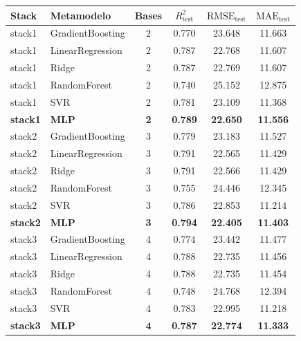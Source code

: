 \begin{table}
    \centering
    \small
    \footnotesize
        \begin{tabular}{llcccc}
        \hline
        \textbf{Stack}  & \textbf{Metamodelo}    & \textbf{Bases} & $R^2_{\text{test}}$ & $\text{RMSE}_{\text{test}}$  & $\text{MAE}_{\text{test}}$   \\
        \hline
        stack1 & GradientBoosting & 2 & 0.770 & 23.648 & 11.663 \\
        stack1 & LinearRegression & 2 & 0.787 & 22.768 & 11.607 \\
        stack1 & Ridge            & 2 & 0.787 & 22.769 & 11.607 \\
        stack1 & RandomForest     & 2 & 0.740 & 25.152 & 12.875 \\
        stack1 & SVR              & 2 & 0.781 & 23.109 & 11.368 \\
        \textbf{stack1} & \textbf{MLP}   & \textbf{2} & \textbf{0.789} & \textbf{22.650} & \textbf{11.556} \\
        \hline
        stack2 & GradientBoosting & 3 & 0.779 & 23.183 & 11.527 \\
        stack2 & LinearRegression & 3 & 0.791 & 22.565 & 11.429 \\
        stack2 & Ridge            & 3 & 0.791 & 22.566 & 11.429 \\
        stack2 & RandomForest     & 3 & 0.755 & 24.446 & 12.345 \\
        stack2 & SVR              & 3 & 0.786 & 22.853 & 11.214 \\
        \textbf{stack2} & \textbf{MLP} & \textbf{3} & \textbf{0.794} & \textbf{22.405} & \textbf{11.403} \\
        \hline
        stack3 & GradientBoosting & 4 & 0.774 & 23.442 & 11.477 \\
        stack3 & LinearRegression & 4 & 0.788 & 22.735 & 11.456 \\
        stack3 & Ridge            & 4 & 0.788 & 22.735 & 11.454 \\
        stack3 & RandomForest     & 4 & 0.748 & 24.768 & 12.394 \\
        stack3 & SVR              & 4 & 0.783 & 22.995 & 11.218 \\
        \textbf{stack3} & \textbf{MLP}              & \textbf{4} & \textbf{0.787} & \textbf{22.774} & \textbf{11.333} \\

\end{tabular}
\end{table}
